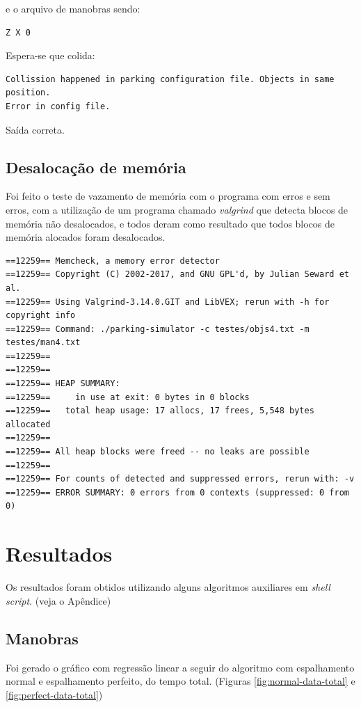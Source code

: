 \documentclass[11pt]{article}
\begin{document}
e o arquivo de manobras sendo:

\begin{verbatim}
Z X 0
\end{verbatim}

Espera-se que colida:

\begin{verbatim}
Collission happened in parking configuration file. Objects in same position.
Error in config file.
\end{verbatim}


Saída correta.

\subsection{Desalocação de memória}
\label{sec:org364429b}
Foi feito o teste de vazamento de memória com o programa com erros e sem erros, com a utilização de um programa chamado \emph{valgrind} que detecta blocos  de memória não desalocados, e todos deram como resultado que todos blocos de memória alocados foram desalocados.
\begin{verbatim}
==12259== Memcheck, a memory error detector
==12259== Copyright (C) 2002-2017, and GNU GPL'd, by Julian Seward et al.
==12259== Using Valgrind-3.14.0.GIT and LibVEX; rerun with -h for copyright info
==12259== Command: ./parking-simulator -c testes/objs4.txt -m testes/man4.txt
==12259== 
==12259== 
==12259== HEAP SUMMARY:
==12259==     in use at exit: 0 bytes in 0 blocks
==12259==   total heap usage: 17 allocs, 17 frees, 5,548 bytes allocated
==12259== 
==12259== All heap blocks were freed -- no leaks are possible
==12259== 
==12259== For counts of detected and suppressed errors, rerun with: -v
==12259== ERROR SUMMARY: 0 errors from 0 contexts (suppressed: 0 from 0)
\end{verbatim}
\section{Resultados}
\label{sec:org7624cf2}

Os resultados foram obtidos utilizando alguns algoritmos auxiliares em \emph{shell script}. (veja o Apêndice) 
\subsection{Manobras}
\label{sec:org34a5138}
Foi gerado o gráfico com regressão linear a seguir do algoritmo com espalhamento normal e espalhamento perfeito, do tempo total. (Figuras \ref{fig:normal-data-total} e \ref{fig:perfect-data-total})
\end{document}
